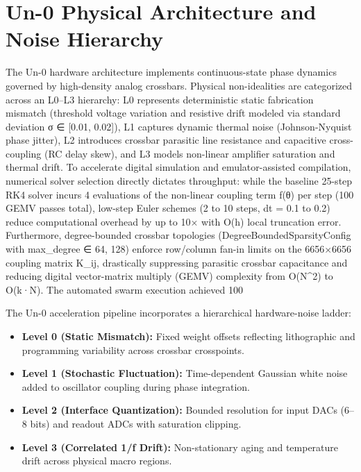 \documentclass[10pt,conference]{IEEEtran}
\begin{document}
\section{Un-0 Physical Architecture and Noise Hierarchy}
The Un-0 hardware architecture implements continuous-state phase dynamics governed by high-density analog crossbars. Physical non-idealities are categorized across an L0–L3 hierarchy: L0 represents deterministic static fabrication mismatch (threshold voltage variation and resistive drift modeled via standard deviation σ ∈ [0.01, 0.02]), L1 captures dynamic thermal noise (Johnson-Nyquist phase jitter), L2 introduces crossbar parasitic line resistance and capacitive cross-coupling (RC delay skew), and L3 models non-linear amplifier saturation and thermal drift. To accelerate digital simulation and emulator-assisted compilation, numerical solver selection directly dictates throughput: while the baseline 25-step RK4 solver incurs 4 evaluations of the non-linear coupling term f(θ) per step (100 GEMV passes total), low-step Euler schemes (2 to 10 steps, dt = 0.1 to 0.2) reduce computational overhead by up to 10× with O(h) local truncation error. Furthermore, degree-bounded crossbar topologies (DegreeBoundedSparsityConfig with max_degree ∈ {64, 128}) enforce row/column fan-in limits on the 6656×6656 coupling matrix K_ij, drastically suppressing parasitic crossbar capacitance and reducing digital vector-matrix multiply (GEMV) complexity from O(N^2) to O(k·N). The automated swarm execution achieved 100%

The Un-0 acceleration pipeline incorporates a hierarchical hardware-noise ladder:
\begin{itemize}
  \item \textbf{Level 0 (Static Mismatch):} Fixed weight offsets reflecting lithographic and programming variability across crossbar crosspoints.
  \item \textbf{Level 1 (Stochastic Fluctuation):} Time-dependent Gaussian white noise added to oscillator coupling during phase integration.
  \item \textbf{Level 2 (Interface Quantization):} Bounded resolution for input DACs (6--8 bits) and readout ADCs with saturation clipping.
  \item \textbf{Level 3 (Correlated 1/f Drift):} Non-stationary aging and temperature drift across physical macro regions.
\end{itemize}
\end{document}
